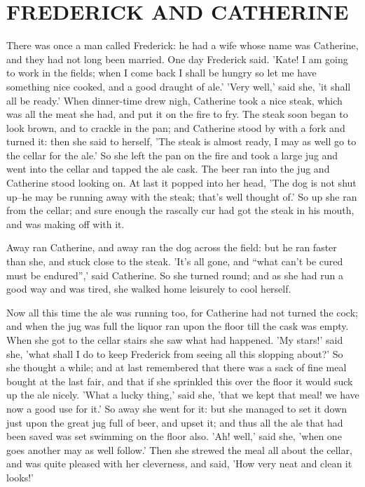 \documentclass[12pt]{book}
\begin{document}
\chapter{FREDERICK AND CATHERINE}

There was once a man called Frederick: he had a wife whose name was
Catherine, and they had not long been married. One day Frederick said.
'Kate! I am going to work in the fields; when I come back I shall be
hungry so let me have something nice cooked, and a good draught of
ale.' 'Very well,' said she, 'it shall all be ready.' When dinner-time
drew nigh, Catherine took a nice steak, which was all the meat she
had, and put it on the fire to fry. The steak soon began to look
brown, and to crackle in the pan; and Catherine stood by with a fork
and turned it: then she said to herself, 'The steak is almost ready, I
may as well go to the cellar for the ale.' So she left the pan on the
fire and took a large jug and went into the cellar and tapped the ale
cask. The beer ran into the jug and Catherine stood looking on. At
last it popped into her head, 'The dog is not shut up--he may be
running away with the steak; that's well thought of.' So up she ran
from the cellar; and sure enough the rascally cur had got the steak in
his mouth, and was making off with it.

Away ran Catherine, and away ran the dog across the field: but he ran
faster than she, and stuck close to the steak. 'It's all gone, and
``what can't be cured must be endured'',' said Catherine. So she turned
round; and as she had run a good way and was tired, she walked home
leisurely to cool herself.

Now all this time the ale was running too, for Catherine had not
turned the cock; and when the jug was full the liquor ran upon the
floor till the cask was empty. When she got to the cellar stairs she
saw what had happened. 'My stars!' said she, 'what shall I do to keep
Frederick from seeing all this slopping about?' So she thought a
while; and at last remembered that there was a sack of fine meal
bought at the last fair, and that if she sprinkled this over the floor
it would suck up the ale nicely. 'What a lucky thing,' said she, 'that
we kept that meal! we have now a good use for it.' So away she went
for it: but she managed to set it down just upon the great jug full of
beer, and upset it; and thus all the ale that had been saved was set
swimming on the floor also. 'Ah! well,' said she, 'when one goes
another may as well follow.' Then she strewed the meal all about the
cellar, and was quite pleased with her cleverness, and said, 'How very
neat and clean it looks!'
\end{document}
